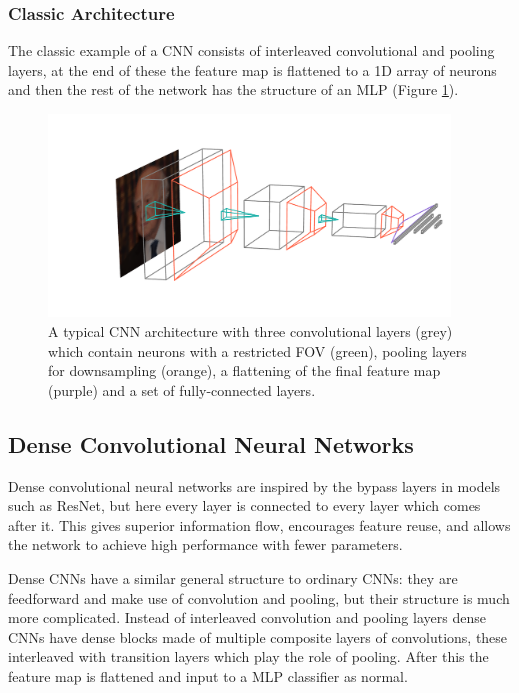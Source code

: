 \subsubsection{Classic Architecture}
The classic example of a CNN consists of interleaved convolutional and pooling layers, at the end of these the feature map is flattened to a 1D array of neurons and then the rest of the network has the structure of an MLP (Figure \ref{fig:machine_learning:classic_CNN}). 
\begin{figure}[h!]
    \includegraphics[width=0.95\textwidth]{figures/machine_learning/convnet_arch.pdf}
    \caption{A typical CNN architecture with three convolutional layers (grey) which contain neurons with a restricted FOV (green), pooling layers for downsampling (orange), a flattening of the final feature map (purple) and a set of fully-connected layers.}
        \label{fig:machine_learning:classic_CNN}
\end{figure}


\subsection{Dense Convolutional Neural Networks}
Dense convolutional neural networks are inspired by the bypass layers in models such as  ResNet, but here every layer is connected to every layer which comes after it. 
This gives superior information flow, encourages feature reuse, and allows the network to achieve high performance with fewer parameters. 

Dense CNNs have a similar general structure to ordinary CNNs: they are feedforward and make use of convolution and pooling, but their structure is much more complicated. 
Instead of interleaved convolution and pooling layers dense CNNs have dense blocks made of multiple composite layers of convolutions, these interleaved with transition layers which play the role of pooling. After this the feature map is flattened and input to a MLP classifier as normal. 

